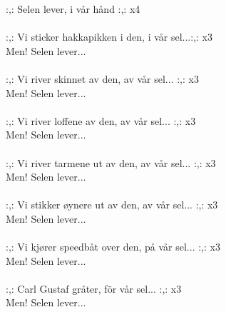 
:,: Selen lever, i vår hånd :,: x4\\
\hspace{10mm}\\
:,: Vi sticker hakkapikken i den, i vår sel...:,: x3\\
Men! Selen lever...\\
\hspace{10mm}\\
:,: Vi river skinnet av den, av vår sel... :,: x3\\
Men! Selen lever...\\
\hspace{10mm}\\
:,: Vi river loffene av den, av vår sel... :,: x3\\
Men! Selen lever...\\
\hspace{10mm}\\
:,: Vi river tarmene ut av den, av vår sel... :,: x3\\
Men! Selen lever...\\
\hspace{10mm}\\
:,: Vi stikker øynere ut av den, av vår sel... :,: x3\\
Men! Selen lever...\\
\hspace{10mm}\\
:,: Vi kjører speedbåt over den, på vår sel... :,:
x3\\
Men! Selen lever...\\
\hspace{10mm}\\
:,: Carl Gustaf gråter, för vår sel... :,: x3\\
Men! Selen lever...\\
